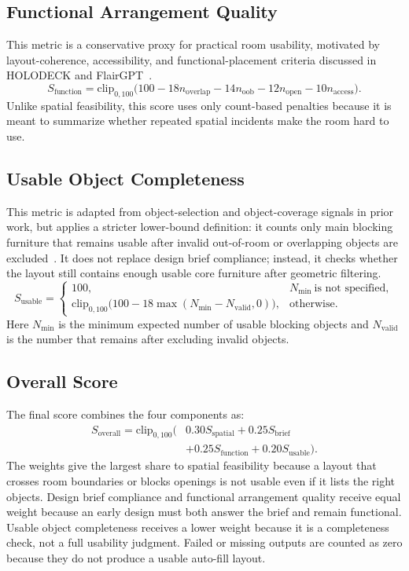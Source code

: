 \subsection{Functional Arrangement Quality}
This metric is a conservative proxy for practical room usability, motivated by layout-coherence, accessibility, and functional-placement criteria discussed in HOLODECK and FlairGPT~\cite{al2024HolodeckLanguageGuided,Littlefair2025FlairgptRepurposingLlms}.
\[
S_{\mathrm{function}}=\mathrm{clip}_{0,100}\bigl(
100
-18n_{\mathrm{overlap}}-14n_{\mathrm{oob}}
-12n_{\mathrm{open}}-10n_{\mathrm{access}}
\bigr).
\]
Unlike spatial feasibility, this score uses only count-based penalties because it is meant to summarize whether repeated spatial incidents make the room hard to use.

\subsection{Usable Object Completeness}
This metric is adapted from object-selection and object-coverage signals in prior work, but applies a stricter lower-bound definition: it counts only main blocking furniture that remains usable after invalid out-of-room or overlapping objects are excluded~\cite{al2024IDesignPersonalized,al2024HolodeckLanguageGuided,Littlefair2025FlairgptRepurposingLlms}. It does not replace design brief compliance; instead, it checks whether the layout still contains enough usable core furniture after geometric filtering.
\[
S_{\mathrm{usable}} =
\begin{cases}
100, & N_{\min}\ \text{is not specified},\\
\mathrm{clip}_{0,100}\bigl(100-18\max(N_{\min}-N_{\mathrm{valid}},0)\bigr), & \text{otherwise}.
\end{cases}
\]
Here \(N_{\min}\) is the minimum expected number of usable blocking objects and \(N_{\mathrm{valid}}\) is the number that remains after excluding invalid objects.

\subsection{Overall Score}
The final score combines the four components as:
\[
\begin{aligned}
S_{\mathrm{overall}}=\mathrm{clip}_{0,100}\bigl(
&0.30S_{\mathrm{spatial}}
+0.25S_{\mathrm{brief}}\\
&+0.25S_{\mathrm{function}}
+0.20S_{\mathrm{usable}}
\bigr).
\end{aligned}
\]
The weights give the largest share to spatial feasibility because a layout that crosses room boundaries or blocks openings is not usable even if it lists the right objects. Design brief compliance and functional arrangement quality receive equal weight because an early design must both answer the brief and remain functional. Usable object completeness receives a lower weight because it is a completeness check, not a full usability judgment. Failed or missing outputs are counted as zero because they do not produce a usable auto-fill layout.

